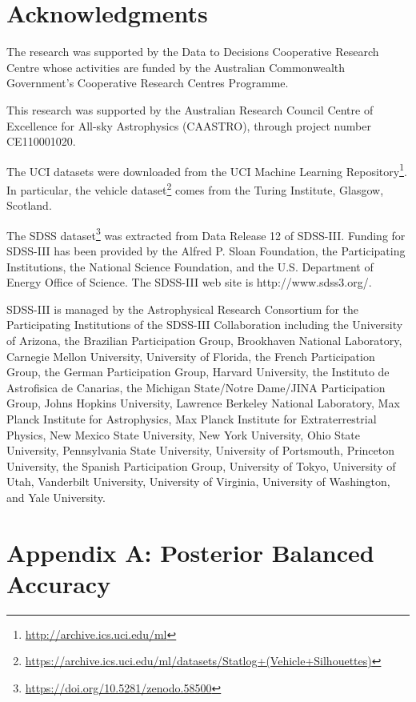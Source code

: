 \documentclass[fleqn,10pt,lineno]{wlpeerj} %
\begin{document}
\section{Acknowledgments}

The research was supported by the Data to Decisions Cooperative Research
Centre whose activities are funded by the Australian Commonwealth Government’s
Cooperative Research Centres Programme.

This research was supported by the Australian Research Council Centre of
Excellence for All-sky Astrophysics (CAASTRO), through project number
CE110001020.

The UCI datasets were downloaded from the UCI Machine Learning
Repository\footnote{\url{http://archive.ics.uci.edu/ml}}. In particular, the
vehicle
dataset\footnote{\url{https://archive.ics.uci.edu/ml/datasets/Statlog+(Vehicle+Silhouettes)}}
comes from the Turing Institute, Glasgow, Scotland.

The SDSS dataset\footnote{\url{https://doi.org/10.5281/zenodo.58500}} was
extracted from Data Release 12 of SDSS-III. Funding for SDSS-III has been
provided by the Alfred P. Sloan Foundation, the Participating Institutions, the
National Science Foundation, and the U.S. Department of Energy Office of
Science. The SDSS-III web site is http://www.sdss3.org/.

SDSS-III is managed by the Astrophysical Research Consortium for the
Participating Institutions of the SDSS-III Collaboration including the
University of Arizona, the Brazilian Participation Group, Brookhaven National
Laboratory, Carnegie Mellon University, University of Florida, the French
Participation Group, the German Participation Group, Harvard University, the
Instituto de Astrofisica de Canarias, the Michigan State/Notre Dame/JINA
Participation Group, Johns Hopkins University, Lawrence Berkeley National
Laboratory, Max Planck Institute for Astrophysics, Max Planck Institute for
Extraterrestrial Physics, New Mexico State University, New York University,
Ohio State University, Pennsylvania State University, University of Portsmouth,
Princeton University, the Spanish Participation Group, University of Tokyo,
University of Utah, Vanderbilt University, University of Virginia, University
of Washington, and Yale University.





\pagebreak

\section*{Appendix A: Posterior Balanced Accuracy}
\end{document}
